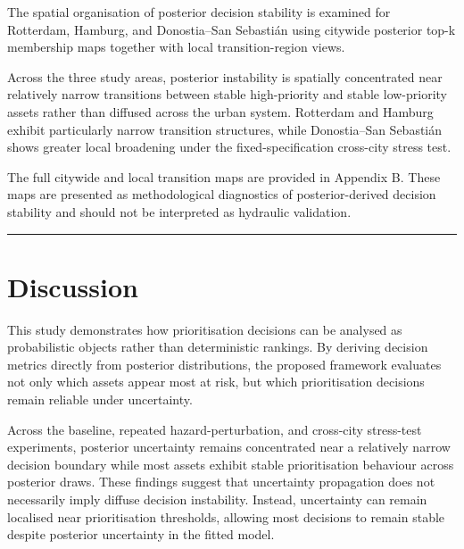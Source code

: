 \documentclass[
]{article}
\begin{document}
The spatial organisation of posterior decision stability is examined for
Rotterdam, Hamburg, and Donostia--San Sebastián using citywide posterior
top-k membership maps together with local transition-region views.

Across the three study areas, posterior instability is spatially
concentrated near relatively narrow transitions between stable
high-priority and stable low-priority assets rather than diffused across
the urban system. Rotterdam and Hamburg exhibit particularly narrow
transition structures, while Donostia--San Sebastián shows greater local
broadening under the fixed-specification cross-city stress test.

The full citywide and local transition maps are provided in Appendix B.
These maps are presented as methodological diagnostics of
posterior-derived decision stability and should not be interpreted as
hydraulic validation.

\begin{center}\rule{0.5\linewidth}{0.5pt}\end{center}

\section{Discussion}\label{discussion}

This study demonstrates how prioritisation decisions can be analysed as
probabilistic objects rather than deterministic rankings. By deriving
decision metrics directly from posterior distributions, the proposed
framework evaluates not only which assets appear most at risk, but which
prioritisation decisions remain reliable under uncertainty.

Across the baseline, repeated hazard-perturbation, and cross-city
stress-test experiments, posterior uncertainty remains concentrated near
a relatively narrow decision boundary while most assets exhibit stable
prioritisation behaviour across posterior draws. These findings suggest
that uncertainty propagation does not necessarily imply diffuse decision
instability. Instead, uncertainty can remain localised near
prioritisation thresholds, allowing most decisions to remain stable
despite posterior uncertainty in the fitted model.
\end{document}
